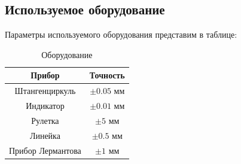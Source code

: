 \documentclass[12pt]{article}
\begin{document}
    \subsection{Используемое оборудование}
    Параметры используемого оборудования представим в таблице:
    \begin{table}[H]
        \centering
        \caption{Оборудование}
        \begin{tabular}{|c|c|}
        \hline
        Прибор         & Точность \\ \hline
        Штангенциркуль & $\pm 0.05$ мм \\ \hline
        Индикатор      & $\pm 0.01$ мм \\ \hline
        Рулетка        & $\pm 5$ мм \\ \hline
        Линейка        & $\pm 0.5$ мм \\ \hline
        Прибор Лермантова & $\pm 1$ мм \\ \hline
        \end{tabular}
    \end{table}
\end{document}
